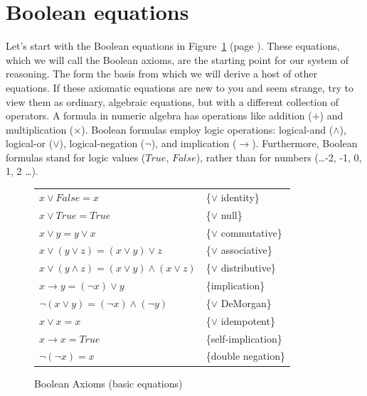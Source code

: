 \section{Boolean equations}
\label{sec:boolean-equations}
Let's start with the Boolean equations in 
Figure~\ref{fig-02-03} (page \pageref{fig-02-03}).
These equations, which we will call the Boolean axioms,
are the starting point for our system of reasoning.
The form the basis from which we will derive
a host of other equations.
If these axiomatic equations are new to you and seem strange, 
try to view them as ordinary,
algebraic equations, but with a different collection of operators.
A formula in numeric algebra has operations like addition
($+$) and multiplication ($\times$). Boolean formulas employ logic
operations: logical-and ($\wedge$), logical-or ($\vee$),
logical-negation ($\neg$), and implication ($\rightarrow$).
Furthermore, Boolean formulas stand for logic values
($True$, $False$), rather than for numbers (\dots -2, -1, 0, 1, 2 \dots).

\begin{figure}
\begin{center}
\begin{tabular}{ll}
$x \vee False = x$                                   & \{$\vee$ identity\} \\
$x \vee True = True$                                 & \{$\vee$ null\} \\
$x \vee y = y \vee x$                                & \{$\vee$ commutative\} \\
$x \vee (y \vee z) = (x \vee y) \vee z$              & \{$\vee$ associative\} \\
$x \vee (y \wedge z) = (x \vee y) \wedge (x \vee z)$ & \{$\vee$ distributive\} \\
$x \rightarrow y = (\neg x) \vee y$                  & \{implication\} \\
$\neg(x \vee y) = (\neg x) \wedge (\neg y)$          & \{$\vee$ DeMorgan\} \\
$x \vee x = x$                                       & \{$\vee$ idempotent\} \\
$x \rightarrow x = True$                             & \{self-implication\} \\
$\neg(\neg x)  = x$                                  & \{double negation\} \\
\end{tabular}
\end{center}
\caption{Boolean Axioms (basic equations)}
\label{fig-02-03}
\end{figure}

